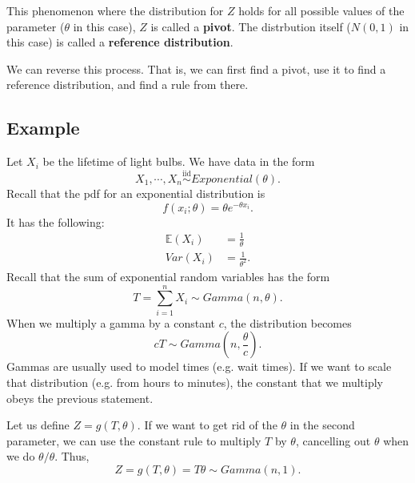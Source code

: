 \documentclass[titlepage, 12pt, leqno]{article}
\begin{document}
\begin{definition}
This phenomenon where the distribution for $Z$ holds for all possible values
of the parameter ($\theta$ in this case), $Z$ is called a \textbf{pivot}. The
distrbution itself ($N(0,1)$ in this case) is called a \textbf{reference
distribution}.
\end{definition}

We can reverse this process. That is, we can first find a pivot, use it to find
a reference distribution, and find a rule from there.

\subsection{Example}
Let $X_{i}$ be the lifetime of light bulbs. We have data in the form
\[
X_{1}, \cdots , X_{n} \overset{\mathrm{iid}}{\sim} Exponential(\theta).
\]
Recall that the pdf for an exponential distribution is
\[
f(x_{i}; \theta) = \theta e^{-\theta x_{i}}.
\]
It has the following:
\begin{align*}
    \mathbb{E}(X_{i}) &= \frac{1}{\theta} \\
    Var(X_{i}) &= \frac{1}{\theta^{2}}.
\end{align*}
Recall that the sum of exponential random variables has the form
\[
    T = \sum_{i=1}^{n}X_{i} \sim Gamma(n, \theta).
\]
When we multiply a gamma by a constant $c$, the distribution becomes
\[
    cT \sim Gamma\left(n, \frac{\theta}{c}\right).
\]
Gammas are usually used to model times (e.g. wait times). If we want to scale
that distribution (e.g. from hours to minutes), the constant that we multiply
obeys the previous statement.

Let us define $Z = g(T,\theta)$. If we want to get rid of the $\theta$ in the
second parameter, we can use the constant rule to multiply $T$ by $\theta$,
cancelling out $\theta$ when we do $\theta/\theta$. Thus,
\[
    Z = g(T,\theta) = T\theta \sim Gamma(n,1).
\]
\end{document}
